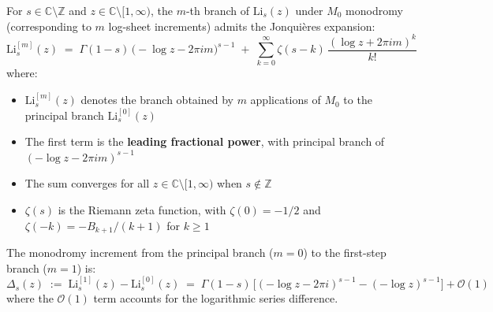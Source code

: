 \begin{proposition}\label{prop:monodromy-increment}
For $s\in\mathbb{C}\setminus\mathbb{Z}$ and $z\in\mathbb{C}\setminus[1,\infty)$, the $m$-th branch of $\mathrm{Li}_s(z)$ under $M_0$ monodromy (corresponding to $m$ log-sheet increments) admits the Jonquières expansion:
\begin{equation}\label{eq:jonquieres-expansion}
\mathrm{Li}_s^{[m]}(z) \;=\; \Gamma(1-s)\,\bigl(-\log z - 2\pi im\bigr)^{s-1} \;+\; \sum_{k=0}^{\infty} \zeta(s-k)\,\frac{(\log z + 2\pi im)^k}{k!}
\end{equation}
where:
\begin{itemize}
\item $\mathrm{Li}_s^{[m]}(z)$ denotes the branch obtained by $m$ applications of $M_0$ to the principal branch $\mathrm{Li}_s^{[0]}(z)$
\item The first term is the \textbf{leading fractional power}, with principal branch of $(-\log z - 2\pi im)^{s-1}$
\item The sum converges for all $z\in\mathbb{C}\setminus[1,\infty)$ when $s\notin\mathbb{Z}$
\item $\zeta(s)$ is the Riemann zeta function, with $\zeta(0) = -1/2$ and $\zeta(-k) = -B_{k+1}/(k+1)$ for $k\geq 1$
\end{itemize}

The monodromy increment from the principal branch ($m=0$) to the first-step branch ($m=1$) is:
\begin{equation}\label{eq:monodromy-increment-m1}
\Delta_s(z) \;:=\; \mathrm{Li}_s^{[1]}(z) - \mathrm{Li}_s^{[0]}(z) \;=\; \Gamma(1-s)\,\bigl[(-\log z - 2\pi i)^{s-1} - (-\log z)^{s-1}\bigr] + \mathcal{O}(1)
\end{equation}
where the $\mathcal{O}(1)$ term accounts for the logarithmic series difference.
\end{proposition}

